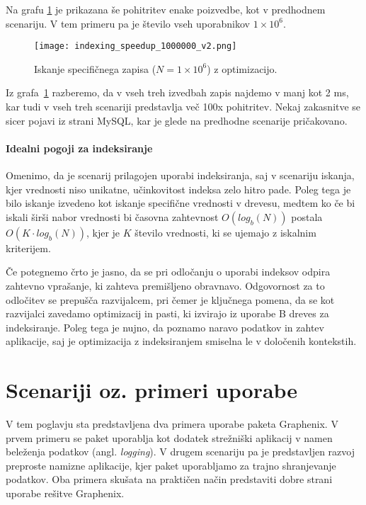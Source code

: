 \documentclass[a4paper,12pt,openright]{book}
\begin{document}
    Na grafu \ref{idx_speedup_2} je prikazana še pohitritev enake poizvedbe, kot v predhodnem scenariju. V tem primeru pa je število vseh uporabnikov $1 \times 10^6$.
    
    \begin{figure}[H]
        \centerline{\texttt{[image: indexing\_speedup\_1000000\_v2.png]}}
        \caption{Iskanje specifičnega zapisa ($N = 1 \times 10^6$) z optimizacijo.}
        \label{idx_speedup_2}
    \end{figure}

    \noindent
    Iz grafa~\ref{idx_speedup_2} razberemo, da v vseh treh izvedbah zapis najdemo v manj kot 2 ms, kar tudi v vseh treh scenariji predstavlja več 100x pohitritev. Nekaj zakasnitve se sicer pojavi iz strani MySQL, kar je glede na predhodne scenarije pričakovano.

    \subsubsection{Idealni pogoji za indeksiranje}
    Omenimo, da je scenarij prilagojen uporabi indeksiranja, saj v scenariju iskanja, kjer vrednosti niso unikatne, učinkovitost indeksa zelo hitro pade. Poleg tega je bilo iskanje izvedeno kot iskanje specifične vrednosti v drevesu, medtem ko če bi iskali širši nabor vrednosti bi časovna zahtevnost $O(log_b(N))$ postala $O(K \cdot log_b(N))$, kjer je $K$ število vrednosti, ki se ujemajo z iskalnim kriterijem.

    Če potegnemo črto je jasno, da se pri odločanju o uporabi indeksov odpira zahtevno vprašanje, ki zahteva premišljeno obravnavo. Odgovornost za to odločitev se prepušča razvijalcem, pri čemer je ključnega pomena, da se kot razvijalci zavedamo optimizacij in pasti, ki izvirajo iz uporabe B dreves za indeksiranje. Poleg tega je nujno, da poznamo naravo podatkov in zahtev aplikacije, saj je optimizacija z indeksiranjem smiselna le v določenih kontekstih.

\chapter{Scenariji oz. primeri uporabe}
\label{ch3}

    V tem poglavju sta predstavljena dva primera uporabe paketa Graphenix. V prvem primeru se paket uporablja kot dodatek strežniški aplikacij v namen beleženja podatkov (angl. \textit{logging}). V drugem scenariju pa je predstavljen razvoj preproste namizne aplikacije, kjer paket uporabljamo za trajno shranjevanje podatkov. Oba primera skušata na praktičen način predstaviti dobre strani uporabe rešitve Graphenix.
\end{document}
